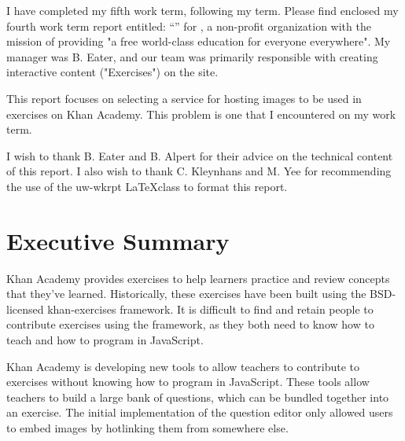\documentclass[se]{uw-wkrpt}
\begin{document}
\frontmatter

\begin{letter}
I have completed my fifth work term, following my \theterm{} term. Please find
enclosed my fourth work term report entitled: ``\thetitle'' for \theemployer, a 
non-profit organization with the mission of providing "a free world-class 
education for everyone everywhere". My manager was B. Eater, and our team was 
primarily responsible with creating interactive content ("Exercises") on the 
site.

This report focuses on selecting a service for hosting images to be used in 
exercises on Khan Academy. This problem is one that I encountered on my work 
term.

I wish to thank B. Eater and B. Alpert for their advice on the technical 
content of this report. I also wish to thank C. Kleynhans and M. Yee for 
recommending the use of the uw-wkrpt \LaTeX class to format this report.

\end{letter}

\section{Executive Summary}
Khan Academy provides exercises to help learners practice and review concepts 
that they've learned. Historically, these exercises have been built using the 
BSD-licensed khan-exercises framework. It is difficult to find and retain 
people to contribute exercises using the framework, as they both need to know 
how to teach and how to program in JavaScript.

Khan Academy is developing new tools to allow teachers to contribute to 
exercises without knowing how to program in JavaScript. These tools allow 
teachers to build a large bank of questions, which can be bundled together into 
an exercise. The initial implementation of the question editor only allowed 
users to embed images by hotlinking them from somewhere else.
\end{document}
